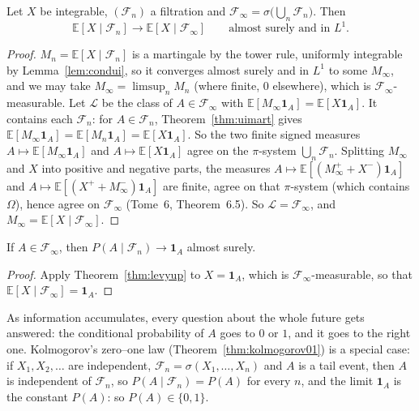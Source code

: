 \begin{theorem}\label{thm:levyup}
Let $X$ be integrable, $(\mathcal F_n)$ a filtration and $\mathcal F_\infty=\sigma\bigl(\bigcup_n\mathcal F_n\bigr)$. Then
\[
\mathbb E[X\mid\mathcal F_n]\longrightarrow\mathbb E[X\mid\mathcal F_\infty]\qquad\text{almost surely and in }L^1.
\]
\end{theorem}
\begin{proof}
$M_n=\mathbb E[X\mid\mathcal F_n]$ is a martingale by the tower rule, uniformly integrable by Lemma~\ref{lem:condui}, so it converges almost surely and in $L^1$ to some $M_\infty$, and we may take
$M_\infty=\limsup_nM_n$ (where finite, $0$ elsewhere), which is $\mathcal F_\infty$-measurable. Let $\mathcal L$ be the class of $A\in\mathcal F_\infty$ with $\mathbb E[M_\infty\mathbf 1_A]=\mathbb E[X\mathbf 1_A]$. It contains each
$\mathcal F_n$: for $A\in\mathcal F_n$, Theorem~\ref{thm:uimart} gives $\mathbb E[M_\infty\mathbf 1_A]=\mathbb E[M_n\mathbf 1_A]=\mathbb E[X\mathbf 1_A]$. So the two finite signed measures
$A\mapsto\mathbb E[M_\infty\mathbf 1_A]$ and $A\mapsto\mathbb E[X\mathbf 1_A]$ agree on the $\pi$-system $\bigcup_n\mathcal F_n$. Splitting $M_\infty$ and $X$ into positive and negative parts, the measures
$A\mapsto\mathbb E[(M_\infty^++X^-)\mathbf 1_A]$ and $A\mapsto\mathbb E[(X^++M_\infty^-)\mathbf 1_A]$ are finite, agree on that $\pi$-system (which contains $\Omega$), hence agree on $\mathcal F_\infty$ (Tome~6, Theorem~6.5).
So $\mathcal L=\mathcal F_\infty$, and $M_\infty=\mathbb E[X\mid\mathcal F_\infty]$.
\end{proof}

\begin{corollary}\label{cor:levy01}
If $A\in\mathcal F_\infty$, then $P(A\mid\mathcal F_n)\to\mathbf 1_A$ almost surely.
\end{corollary}
\begin{proof}
Apply Theorem~\ref{thm:levyup} to $X=\mathbf 1_A$, which is $\mathcal F_\infty$-measurable, so that $\mathbb E[X\mid\mathcal F_\infty]=\mathbf 1_A$.
\end{proof}

As information accumulates, every question about the whole future gets answered: the conditional probability of $A$ goes to $0$ or $1$, and it goes to the right one. Kolmogorov's zero--one law
(Theorem~\ref{thm:kolmogorov01}) is a special case: if $X_1,X_2,\dots$ are independent, $\mathcal F_n=\sigma(X_1,\dots,X_n)$ and $A$ is a tail event, then $A$ is independent of $\mathcal F_n$, so
$P(A\mid\mathcal F_n)=P(A)$ for every $n$, and the limit $\mathbf 1_A$ is the constant $P(A)$: so $P(A)\in\{0,1\}$.

